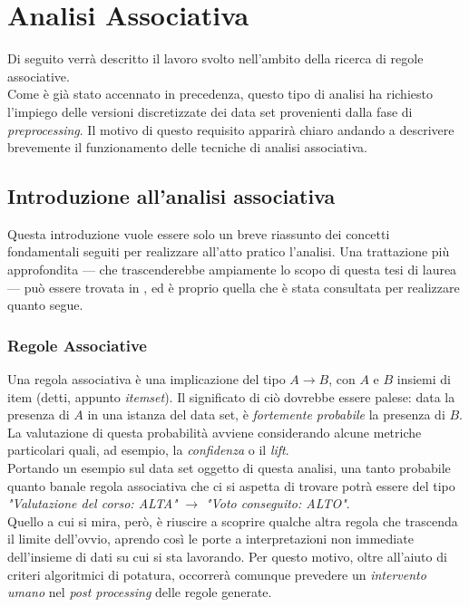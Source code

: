 \chapter{Analisi Associativa}

Di seguito verrà descritto il lavoro svolto nell'ambito della ricerca di regole associative. \\

Come è già stato accennato in precedenza, questo tipo di analisi ha richiesto l'impiego delle versioni discretizzate dei data set provenienti dalla fase di \textit{preprocessing}. Il motivo di questo requisito apparirà chiaro andando a descrivere brevemente il funzionamento delle tecniche di analisi associativa.

\section{Introduzione all'analisi associativa}

    Questa introduzione vuole essere solo un breve riassunto dei concetti fondamentali seguiti per realizzare all'atto pratico l'analisi. Una trattazione più approfondita --- che trascenderebbe  ampiamente lo scopo di questa tesi di laurea --- può essere trovata in \cite{dispense}, ed è proprio quella che è stata consultata per realizzare quanto segue.

    \subsection{Regole Associative}

        Una regola associativa è una implicazione del tipo $A \rightarrow B$, con $A$ e $B$ insiemi di item (detti, appunto \textit{itemset}). Il significato di ciò dovrebbe essere palese: data la presenza di $A$ in una istanza del data set, è \textit{fortemente probabile} la presenza di $B$. La valutazione di questa probabilità avviene considerando alcune metriche particolari quali, ad esempio, la \textit{confidenza} o il \textit{lift}. \\

        Portando un esempio sul data set oggetto di questa analisi, una tanto probabile quanto banale regola associativa che ci si aspetta di trovare potrà essere del tipo \textit{"Valutazione del corso: ALTA"} $\rightarrow$ \textit{"Voto conseguito: ALTO"}. \\
        
        Quello a cui si mira, però, è riuscire a scoprire qualche altra regola che trascenda il limite dell'ovvio, aprendo così le porte a interpretazioni non immediate dell'insieme di dati su cui si sta lavorando. Per questo motivo, oltre all'aiuto di criteri algoritmici di potatura, occorrerà comunque prevedere un \textit{intervento umano} nel \textit{post processing} delle regole generate.

